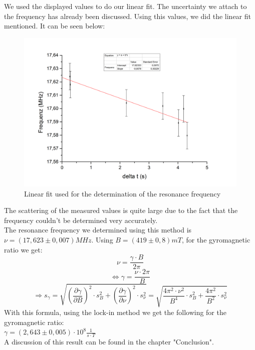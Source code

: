  We used the displayed values to do our linear fit. The uncertainty we attach to the frequency has already been discussed. Using this values, we did the linear fit mentioned. It can be seen below:\\
 \begin{figure}[htbp]
 \begin{center}
 \includegraphics[scale=0.5] {Bilder/linfit}
 \caption{Linear fit used for the determination of the resonance frequency}
 \end{center}
 \end{figure}
 \clearpage
 The scattering of the measured values is quite large due to the fact that the frequency couldn't be determined very accurately. \\
The resonance frequency we determined using this method is $\nu=(17,623\pm0,007) MHz$. Using $B=(419\pm0,8)mT$, for the gyromagnetic ratio we get:\\
\[\nu=\frac{\gamma\cdot B}{2\pi}\]
\[\Leftrightarrow \gamma=\frac{\nu\cdot2\pi}{B}\]
\[\Rightarrow s_{\gamma}=\sqrt{(\frac{\partial \gamma}{\partial B})^{2}\cdot s_{B}^{2}+(\frac{\partial\gamma}{\partial\nu})^{2}\cdot s_{\nu}^{2}}=\sqrt{\frac{4\pi^{2}\cdot\nu^{2}}{B^{4}}\cdot s_{B}^{2}+\frac{4\pi^{2}}{B^{2}}\cdot s_{\nu}^{2}}\]
With this formula, using the lock-in method we get the following for the gyromagnetic ratio:\\
$\gamma=(2,643\pm0,005)\cdot 10^{8}\frac{1}{s\cdot T}$ \\
A discussion of this result can be found in the chapter "Conclusion".